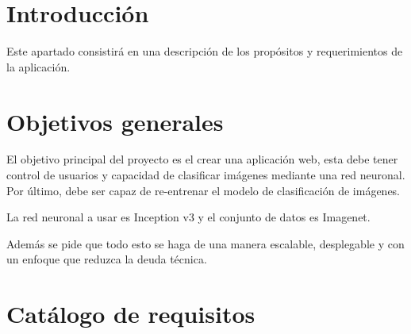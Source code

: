 
\section{Introducción}
Este apartado consistirá en una descripción de los propósitos y requerimientos de la aplicación.

\section{Objetivos generales}
El objetivo principal del proyecto es el crear una aplicación web, esta debe tener control de usuarios y capacidad de clasificar imágenes mediante una red neuronal. Por último, debe ser capaz de re-entrenar el modelo de clasificación de imágenes.

La red neuronal a usar es Inception v3 y el conjunto de datos es Imagenet.

Además se pide que todo esto se haga de una manera escalable, desplegable y con un enfoque que reduzca la deuda técnica.

\section{Catálogo de requisitos}
